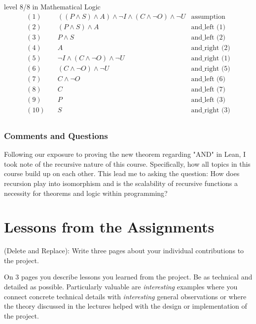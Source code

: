 \documentclass{article}
\theoremstyle{theorem}
\theoremstyle{definition}
\theoremstyle{remark}
\begin{document}
level 8/8 in Mathematical Logic
\[
\begin{aligned}
    (1) &\quad ((P \land S) \land A) \land \neg I \land (C \land \neg O) \land \neg U & \text{assumption} \\
    (2) &\quad (P \land S) \land A & \text{and\_left (1)} \\
    (3) &\quad P \land S & \text{and\_left (2)} \\
    (4) &\quad A & \text{and\_right (2)} \\
    (5) &\quad \neg I \land (C \land \neg O) \land \neg U & \text{and\_right (1)} \\
    (6) &\quad (C \land \neg O) \land \neg U & \text{and\_right (5)} \\
    (7) &\quad C \land \neg O & \text{and\_left (6)} \\
    (8) &\quad C & \text{and\_left (7)} \\
    (9) &\quad P & \text{and\_left (3)} \\
    (10) &\quad S & \text{and\_right (3)} \\
\end{aligned}
\]

\subsubsection*{Comments and Questions}

Following our exposure to proving the new theorem regarding "AND" in Lean, I took note of the recursive nature of this course. Specifically, how all topics in this course build up on each other. This lead me to asking the question: How does recursion play into isomorphism and is the scalability of recursive functions a necessity for theorems and logic within programming?

\section{Lessons from the Assignments}

(Delete and Replace): Write three pages about your individual contributions to the project.

On 3 pages you describe lessons you learned from the project. Be as technical and detailed as possible. Particularly valuable are \emph{interesting} examples where you connect concrete technical details with \emph{interesting} general observations or where the theory discussed in the lectures helped with the design or implementation of the project.
\end{document}

